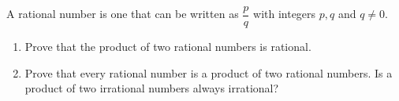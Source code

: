 A rational number is one that can be written as $\dfrac{p}{q}$ with integers $p,q$ and $q\ne0$.
\begin{enumerate}
\item[(a)] Prove that the product of two rational numbers is rational.
\item[(b)] Prove that every rational number is a product of two rational numbers. Is a product of two irrational numbers always irrational?
\end{enumerate}
